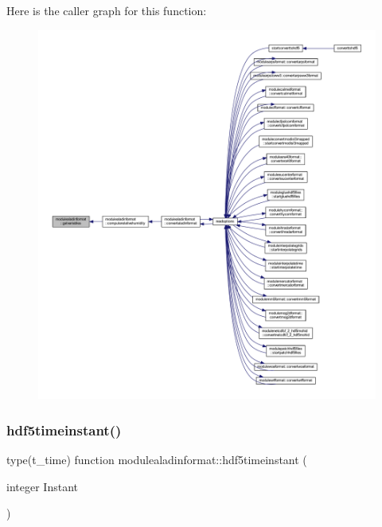 Here is the caller graph for this function\+:\nopagebreak
\begin{figure}[H]
\begin{center}
\leavevmode
\includegraphics[width=350pt]{namespacemodulealadinformat_ac871ced2e3713912a0c9a9563bbab1cb_icgraph}
\end{center}
\end{figure}
\mbox{\label{namespacemodulealadinformat_a5841418d49ae6a17486590f8f686e489}} 
\subsubsection{\texorpdfstring{hdf5timeinstant()}{hdf5timeinstant()}}
{\footnotesize\ttfamily type(t\+\_\+time) function modulealadinformat\+::hdf5timeinstant (\begin{DoxyParamCaption}\item[{integer}]{Instant }\end{DoxyParamCaption})\hspace{0.3cm}{\ttfamily [private]}}

